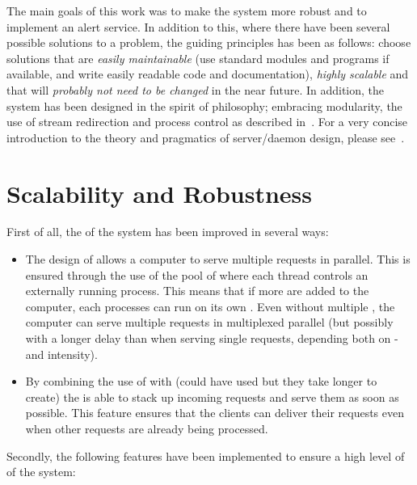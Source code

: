 \documentclass[a4paper,english,11pt,twoside,openright]{book}
\begin{document}
The main goals of this work was to make the system more robust and to
implement an alert service.  In addition to this, where there have
been several possible solutions to a problem, the guiding principles
has been as follows: choose solutions that are \emph{easily
  maintainable} (use standard modules and programs if available, and
write easily readable code and documentation), \emph{highly scalable}
and that will \emph{probably not need to be changed} in the near
future.  In addition, the system has been designed in the spirit of
 philosophy; embracing modularity, the use of stream
redirection and process control as described
in~\cite{ranang03:fragrance_of_unix}.  For a very concise introduction
to the theory and pragmatics of server/daemon design, please
see~\cite{327245,327308,327345}.


\section{Scalability and Robustness}
\label{sec:scalability}

First of all, the  of the system has been improved in
several ways:

\begin{itemize}
\item The design of  allows a computer to serve multiple
   requests in parallel.  This is ensured through the use of
  the pool of  where each thread controls an
  externally running  process.  This means that if more
   are added to the computer, each processes can run on its
  own .  Even without multiple , the computer can
  serve multiple requests in multiplexed parallel (but possibly with a
  longer delay than when serving single requests, depending both on
  - and  intensity).

\item By combining the use of  with  (could
  have used  but they take longer to create) the
   is able to stack up incoming requests and serve them as
  soon as possible.  This feature ensures that the clients can deliver
  their requests even when other requests are already being processed.

\end{itemize}

Secondly, the following features have been implemented to ensure a
high level of  of the system:
\end{document}
